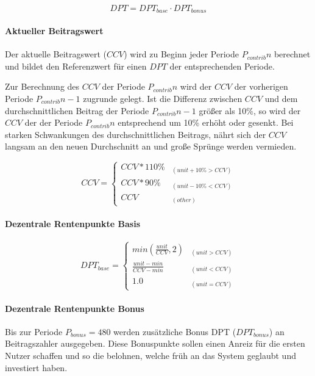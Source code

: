\begin{equation}
DPT = DPT_{base} \cdot DPT_{bonus}
\end{equation}

\paragraph*{Aktueller Beitragswert}

Der aktuelle Beitragswert ($CCV$) wird zu Beginn jeder Periode 
$P_{contrib}{n}$ berechnet und bildet den Referenzwert für einen $DPT$ der
entsprechenden Periode.

Zur Berechnung des $CCV$ der Periode $P_{contrib}{n}$ wird der $CCV$ der vorherigen
Periode $P_{contrib}{n-1}$ zugrunde gelegt. Ist die Differenz zwischen $CCV$ und dem
durchschnittlichen Beitrag der Periode $P_{contrib}{n-1}$ größer als 10\%, so wird
der $CCV$ der der Periode $P_{contrib}{n}$ entsprechend um 10\% erhöht oder gesenkt.
Bei starken Schwankungen des durchschnittlichen Beitrags, nährt sich der $CCV$ langsam an den neuen Durchschnitt an und große Sprünge werden vermieden.

\begin{equation}
CCV = \begin{cases} 
CCV * 110\% & _{(unit+10\% > CCV)} \\
CCV * 90\% & _{(unit-10\% < CCV)} \\
CCV & _{(other)}
\end{cases}
\end{equation}

\paragraph*{Dezentrale Rentenpunkte Basis}

\begin{equation}
DPT_{base} = \begin{cases} 
min(\frac{unit} {CCV}, 2) 
  & _{(unit > CCV)} \\
\frac{unit - min} {CCV - min} 
  & _{(unit < CCV)} \\
1.0 & _{(unit = CCV)}
\end{cases}
\end{equation}

\paragraph*{Dezentrale Rentenpunkte Bonus}

Bis zur Periode $P_{bonus} = 480$ werden zusätzliche Bonus DPT 
($DPT_{bonus}$) an
Beitragszahler ausgegeben. Diese Bonuspunkte sollen einen Anreiz für
die ersten Nutzer schaffen und so die belohnen, welche früh an das System geglaubt und investiert haben.

